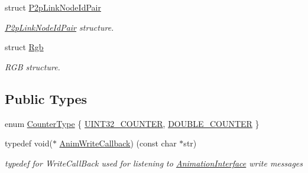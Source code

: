 \begin{DoxyCompactItemize}
struct \hyperlink{structns3_1_1AnimationInterface_1_1P2pLinkNodeIdPair}{P2p\+Link\+Node\+Id\+Pair}
\begin{DoxyCompactList}\small\item\em \hyperlink{structns3_1_1AnimationInterface_1_1P2pLinkNodeIdPair}{P2p\+Link\+Node\+Id\+Pair} structure. \end{DoxyCompactList}\item 
struct \hyperlink{structns3_1_1AnimationInterface_1_1Rgb}{Rgb}
\begin{DoxyCompactList}\small\item\em R\+GB structure. \end{DoxyCompactList}\end{DoxyCompactItemize}
\subsection*{Public Types}
\begin{DoxyCompactItemize}
\item 
enum \hyperlink{classns3_1_1AnimationInterface_a81ef0777d382c5eef63ea798d0ca74b9}{Counter\+Type} \{ \hyperlink{classns3_1_1AnimationInterface_a81ef0777d382c5eef63ea798d0ca74b9aaf239f346550e7e833260a0ec2b62a1b}{U\+I\+N\+T32\+\_\+\+C\+O\+U\+N\+T\+ER}, 
\hyperlink{classns3_1_1AnimationInterface_a81ef0777d382c5eef63ea798d0ca74b9a248150e294ed73c334157f65d25e1eb8}{D\+O\+U\+B\+L\+E\+\_\+\+C\+O\+U\+N\+T\+ER}
 \}
\item 
typedef void($\ast$ \hyperlink{classns3_1_1AnimationInterface_a91003c61e43e2d6cb6192a55d3d69796}{Anim\+Write\+Callback}) (const char $\ast$str)
\begin{DoxyCompactList}\small\item\em typedef for Write\+Call\+Back used for listening to \hyperlink{classns3_1_1AnimationInterface}{Animation\+Interface} write messages \end{DoxyCompactList}\end{DoxyCompactItemize}
